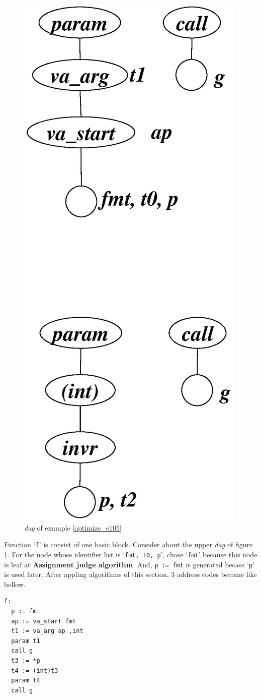 \begin{Example}
\begin{figure}[htbp]
\begin{center}
\begin{latexonly}
\includegraphics[width=1.0\linewidth,height=1.2\linewidth]{opt046.eps}
\end{latexonly}
\caption{{\em dag} of example \ref{optimize_e105}}
\label{optimize_e106}
\end{center}
\end{figure}
Function `{\tt{f}}' is consist of one basic block. Consider about
the upper {\em dag} of figure \ref{optimize_e106}.
For the node whose identifier list is `{\tt{fmt, t0, p}}',
chose `{\tt{fmt}}' because this node is leaf
at {\bf Assignment judge algorithm}.
And, {\tt{p := fmt}} is generated becase `{\tt{p}}' is used later.
After appling algorithms of this section,
3 address codes become like bellow.
\begin{verbatim}
f:
  p := fmt
  ap := va_start fmt
  t1 := va_arg ap ,int
  param t1
  call g
  t3 := *p
  t4 := (int)t3
  param t4
  call g
\end{verbatim}
\end{Example}
